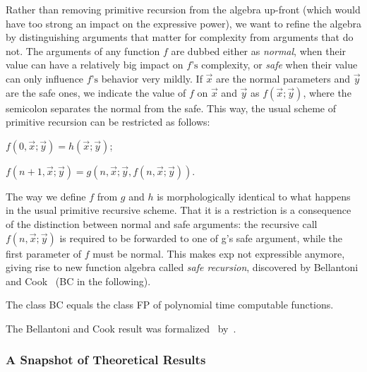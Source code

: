 Rather than removing primitive recursion from the algebra up-front (which would have too strong an impact on the expressive power), %
we want to refine the algebra by distinguishing arguments that matter for complexity from arguments that do not.
The arguments of any function \(f\) are dubbed either as \emph{normal}, when their value can have a relatively big impact on \(f\text{'s}\) complexity, or \emph{safe} when their value can only influence \(f\)\(\text{'s}\) behavior very mildly. %
If \(\vec{x}\) are the normal parameters and \(\vec{y}\) are the safe ones,
we indicate the value of \(f\) on \(\vec{x}\) and \(\vec{y}\) as \(f(\vec{x};\vec{y})\),
where the semicolon separates the normal from the safe.
This way, the usual scheme of primitive recursion can be restricted as follows:

\begin{center}
    \(f (0, \vec{x};\vec{y}) = h (\vec{x};\vec{y})\);

    \(f (n + 1,\vec{x};{ }\vec{y}) = g (n, \vec{x}; \vec{y}, f(n,\vec{x}; \vec{y})) \).
\end{center}

\noindent The way we define \(f\) from \(g\) and \(h\) is morphologically identical to what happens in the usual primitive recursive scheme.
That it is a restriction is a consequence of the distinction between normal and safe arguments: the recursive call \(f(n,\vec{x}; \vec{y})\) is required to be forwarded to one of g's safe argument, while the first parameter of \(f\) must be normal.
This makes exp not expressible anymore, giving rise to new function algebra called \emph{safe recursion}, discovered by Bellantoni and Cook~\cite{bellantoni1992} (BC in the following).

\begin{theorem}
    The class BC equals the class FP of polynomial time computable functions.
\end{theorem}

The Bellantoni and Cook result was formalized~\cite{bc_formal} by~\textcite{heraud2011}.

\subsubsection{A Snapshot of Theoretical Results}
\label{icc-theories}

